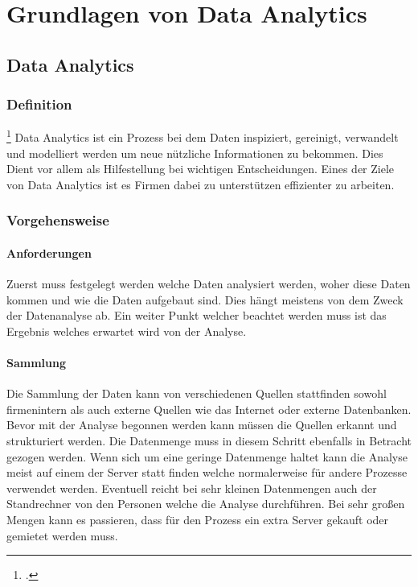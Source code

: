\chapter{Grundlagen von Data Analytics}
\bauer
	
	\section{Data Analytics}
	
		\subsection{Definition} \footcite{data-analysis}
			Data Analytics ist ein Prozess bei dem Daten inspiziert, gereinigt, verwandelt und modelliert werden um neue nützliche Informationen zu bekommen. Dies Dient vor allem als Hilfestellung bei wichtigen Entscheidungen. Eines der Ziele von Data Analytics ist es Firmen dabei zu unterstützen effizienter zu arbeiten. 
	
		\subsection{Vorgehensweise}
		
			\subsubsection{Anforderungen}
				Zuerst muss festgelegt werden welche Daten analysiert werden, woher diese Daten kommen und wie die Daten aufgebaut sind. Dies hängt meistens von dem Zweck der Datenanalyse ab. Ein weiter Punkt welcher beachtet werden muss ist das Ergebnis welches erwartet wird von der Analyse.
			
			\subsubsection{Sammlung}
				Die Sammlung der Daten kann von verschiedenen Quellen stattfinden sowohl firmenintern als auch externe Quellen wie das Internet oder externe Datenbanken. Bevor mit der Analyse begonnen werden kann müssen die Quellen erkannt und strukturiert werden. Die Datenmenge muss in diesem Schritt ebenfalls in Betracht gezogen werden. Wenn sich um eine geringe Datenmenge haltet kann die Analyse meist auf einem der Server statt finden welche normalerweise für andere Prozesse verwendet werden. Eventuell reicht bei sehr kleinen Datenmengen auch der Standrechner von den Personen welche die Analyse durchführen. Bei sehr großen Mengen kann es passieren, dass für den Prozess ein extra Server gekauft oder gemietet werden muss. 
			

